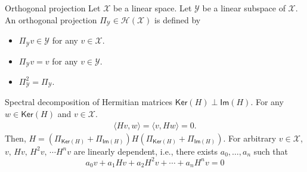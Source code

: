 \documentclass{beamer}
\begin{document}
\begin{frame}{Orthogonal projection}
Let $\mathcal{X}$ be a linear space. Let $\mathcal{Y}$ be a linear subspace of $\mathcal{X}$.
An orthogonal projection $\Pi_\mathcal{Y}\in\mathcal{H}(\mathcal{X})$ is defined by
\begin{itemize}
\item $\Pi_\mathcal{Y} v \in\mathcal{Y}$ for any $v\in\mathcal{X}$.
\item $\Pi_\mathcal{Y} v  = v$ for any $v\in\mathcal{Y}$.
\item $\Pi_\mathcal{Y}^2 = \Pi_\mathcal{Y}$.
\end{itemize}
\end{frame}

\begin{frame}{Spectral decomposition of Hermitian matrices}
$\mathsf{Ker}(H) \perp \mathsf{Im}(H)$.
For any $w\in\mathsf{Ker}(H)$ and $v\in\mathcal{X}$.
\begin{align*}
\langle Hv, w\rangle = \langle v, Hw\rangle = 0.
\end{align*}
Then, $H=(\Pi_{\mathsf{Ker}(H)}+\Pi_{\mathsf{Im}(H)})H(\Pi_{\mathsf{Ker}(H)}+\Pi_{\mathsf{Im}(H)})$.
For arbitrary $v\in\mathcal{X}$, $v,\,Hv,\,H^2v,\,\cdots H^nv$ are linearly dependent, i.e., there exists $a_0,\dotsc,a_n$ such that
\begin{equation*}
a_0v + a_1Hv + a_2H^2 v+ \dotsb + a_n H^n v = 0
\end{equation*}
\end{frame}
\fi
\end{document}
